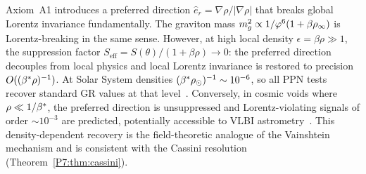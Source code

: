 \begin{remark}
\label{P7:rem:lorentz}
Axiom~A1 introduces a preferred direction $\hat{e}_r = \nabla\rho/|\nabla\rho|$
that breaks global Lorentz invariance fundamentally.  The graviton mass
$m_g^2\propto1/\varphi^6(1+\beta\rho_\infty)$ is Lorentz-breaking in the same
sense.  However, at high local density $\epsilon=\beta\rho\gg1$, the
suppression factor $S_{\mathrm{eff}}=S(\theta)/(1+\beta\rho)\to0$:
the preferred direction decouples from local physics and local Lorentz
invariance is restored to precision $O((\beta^{*}\rho)^{-1})$.
At Solar System densities $(\beta^{*}\rho_\odot)^{-1}\sim10^{-6}$, so all
PPN tests recover standard GR values at that level~\cite{Paper1}.
Conversely, in cosmic voids where $\rho\ll1/\beta^{*}$, the preferred
direction is unsuppressed and Lorentz-violating signals of order
$\sim10^{-3}$ are predicted, potentially accessible to VLBI
astrometry~\cite{Paper1}.  This density-dependent recovery is the
field-theoretic analogue of the Vainshtein mechanism and is consistent
with the Cassini resolution (Theorem~\ref{P7:thm:cassini}).
\end{remark}

